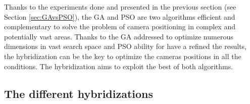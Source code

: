 Thanks to the experiments done and presented in the previous section (see  Section \ref{sec:GAvsPSO}), the GA and PSO are two algorithms efficient and complementary to solve the problem of camera positioning in complex and potentially vast areas. 
Thanks to the GA addressed to optimize numerous dimensions in vast search space and PSO ability for have a refined the results,
 the hybridization can be the key to optimize the cameras positions in all the conditions. The hybridization aims to exploit the best of both algorithms. 

\subsection{The different hybridizations }

